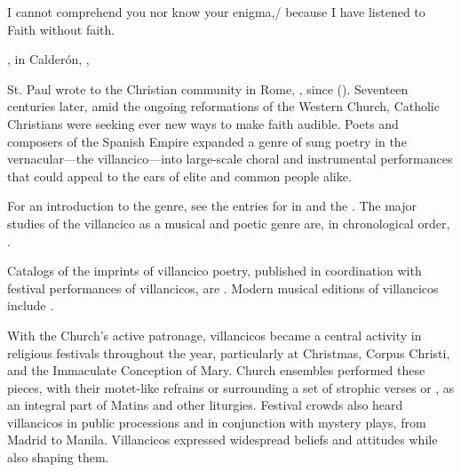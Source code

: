 


\label{ch:faith-hearing}

\epigraph
{I cannot comprehend you nor know your enigma,/ because I have listened to Faith without faith.}
{, in Calderón, , \textlinenums{13\XXX--\XXX}}

St. Paul wrote to the Christian community in Rome, , since  ().
Seventeen centuries later, amid the ongoing reformations of the Western Church, Catholic Christians were seeking ever new ways to make faith audible.
Poets and composers of the Spanish Empire expanded a genre of sung poetry in the vernacular---the villancico---into large-scale choral and instrumental performances that could appeal to the ears of elite and common people alike.%
\begin{Footnote}
For an introduction to the genre, see the entries for  in  and the .
The major studies of the villancico as a musical and poetic genre are, in chronological order, \autocites{Rubio:Forma}{Laird:VC}{Torrente:PhD}{Tenorio:SorJuana}
{CaberoPueyo:PhD}{Illari:Polychoral}{Knighton-Torrente:VCs}
{Cashner:Cards}{Cashner:PhD}.

Catalogs of the imprints of villancico poetry, published in coordination with festival performances of villancicos, are \autocites{BNE:VCs17C}{BNE:VCs18C}{UK:VCs}{US:VCs}. \XXX[Montserrat]
Modern musical editions of villancicos include \autocites{Cererols:MEM-VC}
{Stevenson:Christmas}{Ruimonte:Parnaso}{Padilla:Tello}{Ezquerro:MME55}
{RuizSamaniego:MME63}{Ezquerro:MME59}{Ezquerro:MME65}{Fernandez:Cancionero}
{Torrejon:VCs}{Cashner:SingingAboutSingingI}.
\end{Footnote}

With the Church's active patronage, villancicos became a central activity in religious festivals throughout the year, particularly at Christmas, Corpus Christi, and the Immaculate Conception of Mary.
Church ensembles performed these pieces, with their motet-like refrains or  surrounding a set of strophic verses or , as an integral part of Matins and other liturgies.
Festival crowds also heard villancicos in public processions and in conjunction with mystery plays, from Madrid to Manila.
Villancicos expressed widespread beliefs and attitudes while also shaping them.

